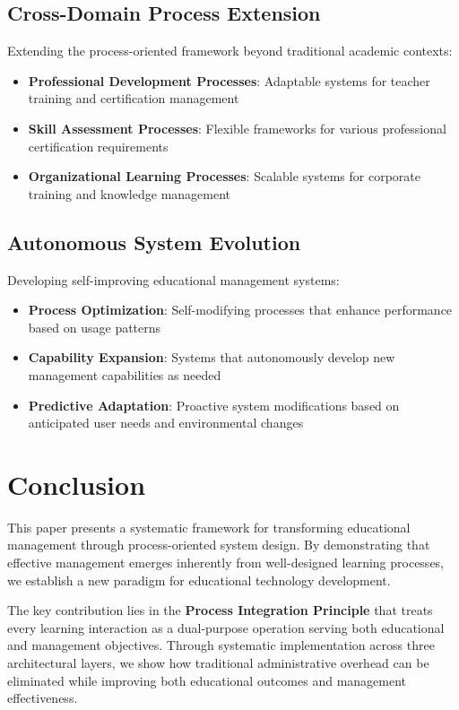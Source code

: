 \documentclass[conference]{IEEEtran}
\begin{document}
\subsection{Cross-Domain Process Extension}

Extending the process-oriented framework beyond traditional academic contexts:

\begin{itemize}
    \item \textbf{Professional Development Processes}: Adaptable systems for teacher training and certification management
    \item \textbf{Skill Assessment Processes}: Flexible frameworks for various professional certification requirements
    \item \textbf{Organizational Learning Processes}: Scalable systems for corporate training and knowledge management
\end{itemize}

\subsection{Autonomous System Evolution}

Developing self-improving educational management systems:

\begin{itemize}
    \item \textbf{Process Optimization}: Self-modifying processes that enhance performance based on usage patterns
    \item \textbf{Capability Expansion}: Systems that autonomously develop new management capabilities as needed
    \item \textbf{Predictive Adaptation}: Proactive system modifications based on anticipated user needs and environmental changes
\end{itemize}

\section{Conclusion}

This paper presents a systematic framework for transforming educational management through process-oriented system design. By demonstrating that effective management emerges inherently from well-designed learning processes, we establish a new paradigm for educational technology development.

The key contribution lies in the \textbf{Process Integration Principle} that treats every learning interaction as a dual-purpose operation serving both educational and management objectives. Through systematic implementation across three architectural layers, we show how traditional administrative overhead can be eliminated while improving both educational outcomes and management effectiveness.
\end{document}
